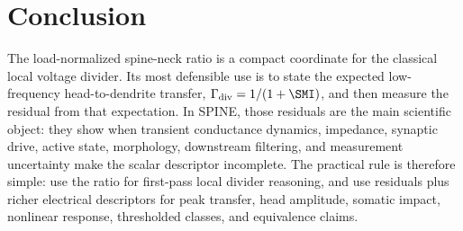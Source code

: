 \section{Conclusion}

The load-normalized spine-neck ratio is a compact coordinate for the classical local voltage divider. Its most defensible use is to state the expected low-frequency head-to-dendrite transfer, $\Gamma_{\mathrm{div}}=1/(1+\SMI)$, and then measure the residual from that expectation. In SPINE, those residuals are the main scientific object: they show when transient conductance dynamics, impedance, synaptic drive, active state, morphology, downstream filtering, and measurement uncertainty make the scalar descriptor incomplete. The practical rule is therefore simple: use the ratio for first-pass local divider reasoning, and use residuals plus richer electrical descriptors for peak transfer, head amplitude, somatic impact, nonlinear response, thresholded classes, and equivalence claims.
